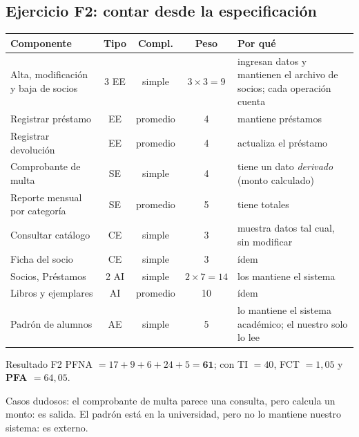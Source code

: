 \documentclass[11pt,a4paper]{article}
\begin{document}
\subsection*{Ejercicio F2: contar desde la especificación}
\begin{center}\small
\begin{tabularx}{\textwidth}{@{}l c c c X@{}}
\toprule
Componente & Tipo & Compl. & Peso & Por qué\\
\midrule
Alta, modificación y baja de socios & 3 EE & simple & $3 \times 3 = 9$ & ingresan datos y mantienen el archivo de socios; cada operación cuenta\\
Registrar préstamo & EE & promedio & 4 & mantiene préstamos\\
Registrar devolución & EE & promedio & 4 & actualiza el préstamo\\
Comprobante de multa & SE & simple & 4 & tiene un dato \emph{derivado} (monto calculado)\\
Reporte mensual por categoría & SE & promedio & 5 & tiene totales\\
Consultar catálogo & CE & simple & 3 & muestra datos tal cual, sin modificar\\
Ficha del socio & CE & simple & 3 & ídem\\
Socios, Préstamos & 2 AI & simple & $2 \times 7 = 14$ & los mantiene el sistema\\
Libros y ejemplares & AI & promedio & 10 & ídem\\
Padrón de alumnos & AE & simple & 5 & lo mantiene el sistema académico; el nuestro solo lo lee\\
\bottomrule
\end{tabularx}
\end{center}
\begin{resultado}{Resultado F2}
PFNA $= 17 + 9 + 6 + 24 + 5 = \mathbf{61}$; con TI $= 40$, FCT $= 1{,}05$ y \textbf{PFA $= 64{,}05$}.
\end{resultado}
Casos dudosos: el comprobante de multa parece una consulta, pero calcula un monto: es salida. El padrón está en
la universidad, pero no lo mantiene nuestro sistema: es externo.
\end{document}
